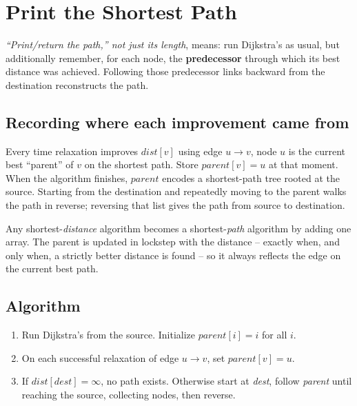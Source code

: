 \section{Print the Shortest Path}
\label{sec:graph-print-shortest-path}


\begin{patternbox}
\emph{``Print/return the path,'' not just its length}, means: run
Dijkstra's as usual, but additionally remember, for each node, the
\textbf{predecessor} through which its best distance was achieved.
Following those predecessor links backward from the destination
reconstructs the path.
\end{patternbox}

\subsection*{Recording where each improvement came from}

Every time relaxation improves $\textit{dist}[v]$ using edge $u\to v$,
node $u$ is the current best ``parent'' of $v$ on the shortest path.
Store $\textit{parent}[v]=u$ at that moment. When the algorithm
finishes, $\textit{parent}$ encodes a shortest-path tree rooted at the
source. Starting from the destination and repeatedly moving to the
parent walks the path in reverse; reversing that list gives the path
from source to destination.

\begin{ideabox}
Any shortest-\emph{distance} algorithm becomes a shortest-\emph{path}
algorithm by adding one array. The parent is updated in lockstep with
the distance -- exactly when, and only when, a strictly better distance
is found -- so it always reflects the edge on the current best path.
\end{ideabox}

\subsection*{Algorithm}

\begin{enumerate}
  \item Run Dijkstra's from the source. Initialize
        $\textit{parent}[i]=i$ for all $i$.
  \item On each successful relaxation of edge $u\to v$, set
        $\textit{parent}[v]=u$.
  \item If $\textit{dist}[\textit{dest}]=\infty$, no path exists.
        Otherwise start at \textit{dest}, follow \textit{parent} until
        reaching the source, collecting nodes, then reverse.
\end{enumerate}

